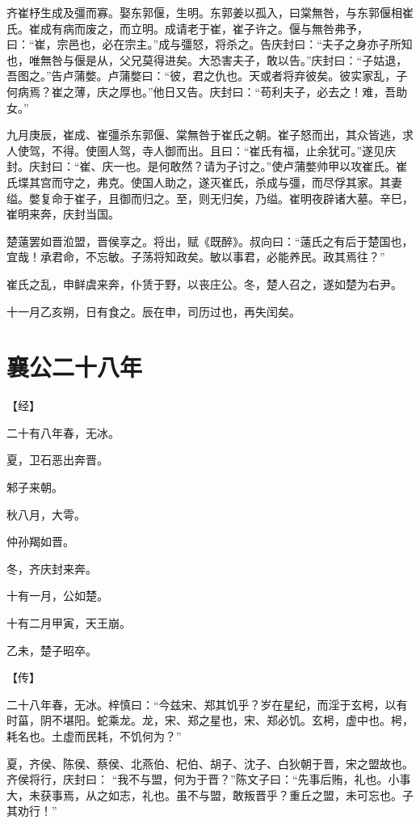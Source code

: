 \documentclass[a4paper,12pt,UTF8,twoside]{ctexbook}
\begin{document}
齐崔杼生成及彊而寡。娶东郭偃，生明。东郭姜以孤入，曰棠無咎，与东郭偃相崔氏。崔成有病而废之，而立明。成请老于崔，崔子许之。偃与無咎弗予，曰：“崔，宗邑也，必在宗主。”成与彊怒，将杀之。告庆封曰：“夫子之身亦子所知也，唯無咎与偃是从，父兄莫得进矣。大恐害夫子，敢以告。”庆封曰：“子姑退，吾图之。”告卢蒲嫳。卢蒲嫳曰：“彼，君之仇也。天或者将弃彼矣。彼实家乱，子何病焉？崔之薄，庆之厚也。”他日又告。庆封曰：“苟利夫子，必去之！难，吾助女。”

九月庚辰，崔成、崔彊杀东郭偃、棠無咎于崔氏之朝。崔子怒而出，其众皆逃，求人使驾，不得。使圉人驾，寺人御而出。且曰：“崔氏有福，止余犹可。”遂见庆封。庆封曰：“崔、庆一也。是何敢然？请为子讨之。”使卢蒲嫳帅甲以攻崔氏。崔氏堞其宫而守之，弗克。使国人助之，遂灭崔氏，杀成与彊，而尽俘其家。其妻缢。嫳复命于崔子，且御而归之。至，则无归矣，乃缢。崔明夜辟诸大墓。辛巳，崔明来奔，庆封当国。

楚薳罢如晋涖盟，晋侯享之。将出，赋《既醉》。叔向曰：“薳氏之有后于楚国也，宜哉！承君命，不忘敏。子荡将知政矣。敏以事君，必能养民。政其焉往？”

崔氏之乱，申鲜虞来奔，仆赁于野，以丧庄公。冬，楚人召之，遂如楚为右尹。

十一月乙亥朔，日有食之。辰在申，司历过也，再失闰矣。


\section{襄公二十八年}



【经】

二十有八年春，无冰。

夏，卫石恶出奔晋。

邾子来朝。

秋八月，大雩。

仲孙羯如晋。

冬，齐庆封来奔。

十有一月，公如楚。

十有二月甲寅，天王崩。

乙未，楚子昭卒。

【传】

二十八年春，无冰。梓慎曰：“今兹宋、郑其饥乎？岁在星纪，而淫于玄枵，以有时菑，阴不堪阳。蛇乘龙。龙，宋、郑之星也，宋、郑必饥。玄枵，虚中也。枵，耗名也。土虚而民耗，不饥何为？”

夏，齐侯、陈侯、蔡侯、北燕伯、杞伯、胡子、沈子、白狄朝于晋，宋之盟故也。齐侯将行，庆封曰： “我不与盟，何为于晋？”陈文子曰：“先事后贿，礼也。小事大，未获事焉，从之如志，礼也。虽不与盟，敢叛晋乎？重丘之盟，未可忘也。子其劝行！”
\end{document}
